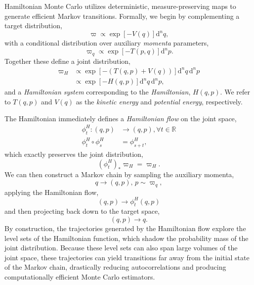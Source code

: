 \documentclass{article}
\begin{document}
Hamiltonian Monte Carlo \cite{DuaneEtAl:1987, Neal:2011, BetancourtEtAl:2014}
utilizes deterministic, measure-preserving maps to generate efficient 
Markov transitions.  Formally, we begin by complementing a target distribution,
%
\begin{equation*}
\varpi \propto \exp \! \left[ - V ( q ) \right] \mathrm{d}^{n} q,
\end{equation*}
%
with a conditional distribution over auxiliary \textit{momenta} parameters,
%
\begin{equation*}
\varpi_{q} \propto \exp \! \left[ - T (p, q) \right] \mathrm{d}^{n} p.
\end{equation*}
%
Together these define a joint distribution,
%
\begin{align*}
\varpi_{H} 
&\propto \exp \! \left[ - \left( T (q, p) + V (q) \right) \right] \mathrm{d}^{n} q \, \mathrm{d}^{n} p
\\
&\propto \exp \! \left[ - H (q, p) \right] \mathrm{d}^{n} q \, \mathrm{d}^{n} p,
\end{align*}
%
and a \textit{Hamiltonian system} corresponding to the \textit{Hamiltonian},
$ H (q, p) $.  We refer to $T (q, p)$ and $V (q)$ as the \textit{kinetic energy} 
and \textit{potential energy}, respectively.

The Hamiltonian immediately defines a \textit{Hamiltonian flow} on the joint
space,
%
\begin{align*}
\phi^{H}_{t} : (q, p) &\rightarrow (q, p), \forall t \in \mathbb{R}
\\
\phi^{H}_{t} \circ \phi^{H}_{s} &= \phi^{H}_{s + t},
\end{align*}
%
which exactly preserves the joint distribution,
%
\begin{equation*}
\left( \phi^{H}_{t} \right)_{*} \varpi_{H} = \varpi_{H}.
\end{equation*}
%
We can then construct a Markov chain by sampling the auxiliary momenta, 
%
\begin{equation*}
q \rightarrow (q, p), \, p \sim \varpi_{q},
\end{equation*}
%
applying the Hamiltonian flow,
%
\begin{equation*}
(q, p) \rightarrow \phi^{H}_{t} (q, p)
\end{equation*}
%
and then projecting back down to the target space,
%
\begin{equation*}
(q, p) \rightarrow q.
\end{equation*}
%
By construction, the trajectories generated by the Hamiltonian flow 
explore the level sets of the Hamiltonian function, which shadow the
probability mass of the joint distribution.  Because these level sets
can also span large volumes of the joint space, these trajectories
can yield transitions far away from the initial state of the Markov
chain, drastically reducing autocorrelations and producing computationally
efficient Monte Carlo estimators.
\end{document}
